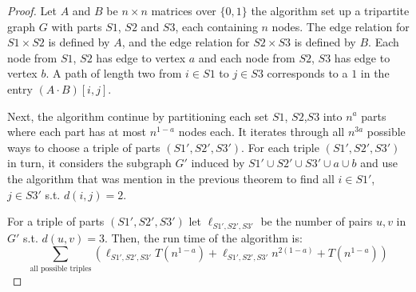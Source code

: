 \begin{proof}
 Let $A$ and $B$ be $n \times n$ matrices over $\{0, 1\}$ the algorithm set up a tripartite graph $G$ with parts $S1$, $S2$ and $S3$, each containing $n$ nodes. The edge relation for $S1 \times S2$ is defined by $A$, and the edge relation for $S2 \times S3$ is defined by $B$. Each node from $S1$, $S2$ has edge to vertex $a$ and each node from $S2$, $S3$ has edge to vertex $b$. A path of length two from $i \in S1$ to $j \in S3$ corresponds to a $1$ in the entry $(A · B)[i, j]$.
 
Next, the algorithm continue by partitioning each set $S1$, $S2$,$S3$ into $n^a$ parts where each part has at most
$n^{1 - a}$ nodes each. It iterates through all $n^{3a}$  possible ways to choose a triple of parts $(S1',S2',S3')$.
For each triple $(S1',S2',S3')$ in turn, it considers the subgraph $G'$ induced by $S1' \cup S2' \cup S3'\cup a \cup b$ and use the algorithm that was mention in the previous theorem  to find all $i\in S1'$, $j\in S3'$ s.t. $d(i,j)=2$.

For a triple of parts $(S1',S2',S3')$ let $\ell_{S1',S2',S3'}$  be the number
of pairs $u,v$ in $G'$ s.t. $d(u,v)=3$. 
Then, the run time of the algorithm is:
\[
\sum_{\textrm{all possible triples}} (\ell_{S1',S2',S3'} T(n^{1-a})+\ell_{S1',S2',S3'} n^{2(1-a)}+T(n^{1-a})) 
\]


\end{proof}

